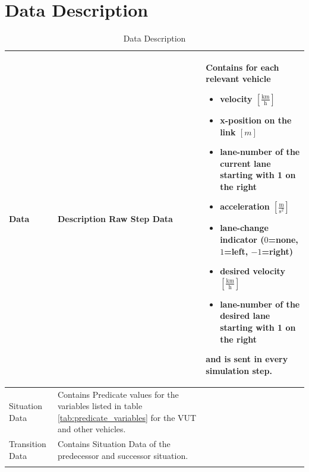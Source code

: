 \documentclass[a4paper, 11pt]{scrreprt}
\begin{document}
	\section{Data Description}

	\begin{longtabu}{|X[-1,m]|X[l,m]|}
		\hline
		\rowfont[l]{\bfseries} Data & Description \endhead \hline
		Raw Step Data & Contains for each relevant vehicle
			\begin{itemize}
				\item velocity $\left[\frac{\text{km}}{\text{h}}\right]$
				\item x-position on the link $\left[m\right]$
				\item lane-number of the current lane starting with 1 on the right
				\item acceleration $\left[\frac{\text{m}}{\text{s$^2$}}\right]$
				\item lane-change indicator ($0$=none, $1$=left, $-1$=right)
				\item desired velocity $\left[\frac{\text{km}}{\text{h}}\right]$
				\item lane-number of the desired lane starting with 1 on the right
			\end{itemize} 
			and is sent in every simulation step.\\ \hline
		Situation Data & Contains Predicate values for the variables listed in table \ref{tab:predicate_variables} for the VUT and other vehicles.\\ \hline
		Transition Data & Contains Situation Data of the predecessor and successor situation.\\ \hline
		\caption{Data Description}
		\label{tab:data_description}
	\end{longtabu}
	
\end{document}
